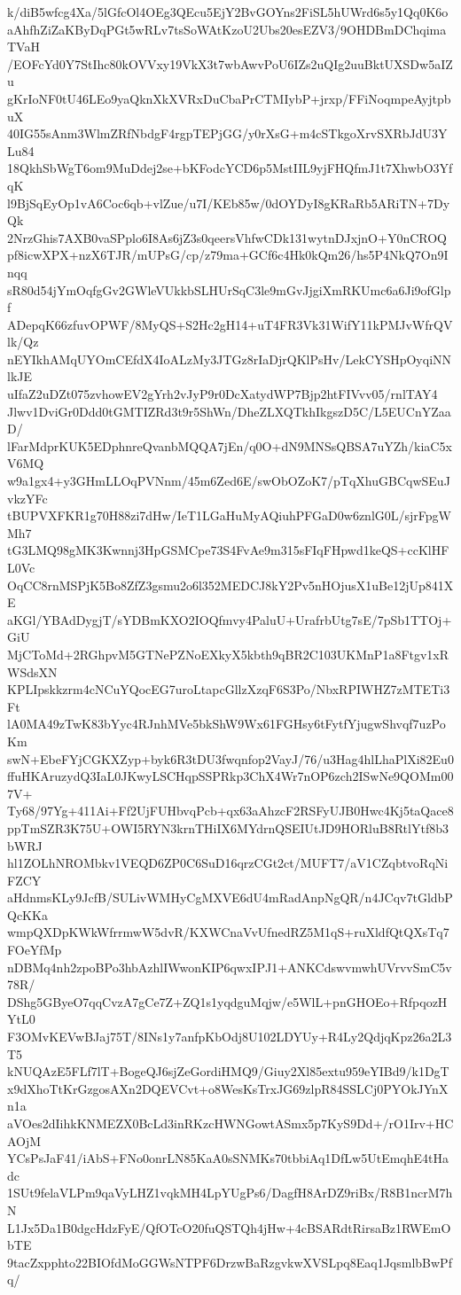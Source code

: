 k/diB5wfcg4Xa/5lGfcOl4OEg3QEcu5EjY2BvGOYns2FiSL5hUWrd6s5y1Qq0K6o
aAhfhZiZaKByDqPGt5wRLv7tsSoWAtKzoU2Ubs20esEZV3/9OHDBmDChqimaTVaH
/EOFcYd0Y7StIhc80kOVVxy19VkX3t7wbAwvPoU6IZs2uQIg2uuBktUXSDw5aIZu
gKrIoNF0tU46LEo9yaQknXkXVRxDuCbaPrCTMIybP+jrxp/FFiNoqmpeAyjtpbuX
40IG55sAnm3WlmZRfNbdgF4rgpTEPjGG/y0rXsG+m4cSTkgoXrvSXRbJdU3YLu84
18QkhSbWgT6om9MuDdej2se+bKFodcYCD6p5MstIIL9yjFHQfmJ1t7XhwbO3YfqK
l9BjSqEyOp1vA6Coc6qb+vlZue/u7I/KEb85w/0dOYDyI8gKRaRb5ARiTN+7DyQk
2NrzGhis7AXB0vaSPplo6I8As6jZ3s0qeersVhfwCDk131wytnDJxjnO+Y0nCROQ
pf8icwXPX+nzX6TJR/mUPsG/cp/z79ma+GCf6c4Hk0kQm26/hs5P4NkQ7On9Inqq
sR80d54jYmOqfgGv2GWleVUkkbSLHUrSqC3le9mGvJjgiXmRKUmc6a6Ji9ofGlpf
ADepqK66zfuvOPWF/8MyQS+S2Hc2gH14+uT4FR3Vk31WifY11kPMJvWfrQVlk/Qz
nEYIkhAMqUYOmCEfdX4IoALzMy3JTGz8rIaDjrQKlPsHv/LekCYSHpOyqiNNlkJE
uIfaZ2uDZt075zvhowEV2gYrh2vJyP9r0DcXatydWP7Bjp2htFIVvv05/rnlTAY4
Jlwv1DviGr0Ddd0tGMTIZRd3t9r5ShWn/DheZLXQTkhIkgszD5C/L5EUCnYZaaD/
lFarMdprKUK5EDphnreQvanbMQQA7jEn/q0O+dN9MNSsQBSA7uYZh/kiaC5xV6MQ
w9a1gx4+y3GHmLLOqPVNnm/45m6Zed6E/swObOZoK7/pTqXhuGBCqwSEuJvkzYFc
tBUPVXFKR1g70H88zi7dHw/IeT1LGaHuMyAQiuhPFGaD0w6znlG0L/sjrFpgWMh7
tG3LMQ98gMK3Kwnnj3HpGSMCpe73S4FvAe9m315sFIqFHpwd1keQS+ccKlHFL0Vc
OqCC8rnMSPjK5Bo8ZfZ3gsmu2o6l352MEDCJ8kY2Pv5nHOjusX1uBe12jUp841XE
aKGl/YBAdDygjT/sYDBmKXO2IOQfmvy4PaluU+UrafrbUtg7sE/7pSb1TTOj+GiU
MjCToMd+2RGhpvM5GTNePZNoEXkyX5kbth9qBR2C103UKMnP1a8Ftgv1xRWSdsXN
KPLIpskkzrm4cNCuYQocEG7uroLtapcGllzXzqF6S3Po/NbxRPIWHZ7zMTETi3Ft
lA0MA49zTwK83bYyc4RJnhMVe5bkShW9Wx61FGHsy6tFytfYjugwShvqf7uzPoKm
swN+EbeFYjCGKXZyp+byk6R3tDU3fwqnfop2VayJ/76/u3Hag4hlLhaPlXi82Eu0
ffuHKAruzydQ3IaL0JKwyLSCHqpSSPRkp3ChX4Wr7nOP6zch2ISwNe9QOMm007V+
Ty68/97Yg+411Ai+Ff2UjFUHbvqPcb+qx63aAhzcF2RSFyUJB0Hwc4Kj5taQace8
ppTmSZR3K75U+OWI5RYN3krnTHiIX6MYdrnQSEIUtJD9HORluB8RtlYtf8b3bWRJ
hl1ZOLhNROMbkv1VEQD6ZP0C6SuD16qrzCGt2ct/MUFT7/aV1CZqbtvoRqNiFZCY
aHdnmsKLy9JcfB/SULivWMHyCgMXVE6dU4mRadAnpNgQR/n4JCqv7tGldbPQcKKa
wmpQXDpKWkWfrrmwW5dvR/KXWCnaVvUfnedRZ5M1qS+ruXldfQtQXsTq7FOeYfMp
nDBMq4nh2zpoBPo3hbAzhlIWwonKIP6qwxIPJ1+ANKCdswvmwhUVrvvSmC5v78R/
DShg5GByeO7qqCvzA7gCe7Z+ZQ1s1yqdguMqjw/e5WlL+pnGHOEo+RfpqozHYtL0
F3OMvKEVwBJaj75T/8INs1y7anfpKbOdj8U102LDYUy+R4Ly2QdjqKpz26a2L3T5
kNUQAzE5FLf7lT+BogeQJ6sjZeGordiHMQ9/Giuy2Xl85extu959eYIBd9/k1DgT
x9dXhoTtKrGzgosAXn2DQEVCvt+o8WesKsTrxJG69zlpR84SSLCj0PYOkJYnXn1a
aVOes2dIihkKNMEZX0BcLd3inRKzcHWNGowtASmx5p7KyS9Dd+/rO1Irv+HCAOjM
YCsPsJaF41/iAbS+FNo0onrLN85KaA0sSNMKs70tbbiAq1DfLw5UtEmqhE4tHadc
1SUt9felaVLPm9qaVyLHZ1vqkMH4LpYUgPs6/DagfH8ArDZ9riBx/R8B1ncrM7hN
L1Jx5Da1B0dgcHdzFyE/QfOTcO20fuQSTQh4jHw+4cBSARdtRirsaBz1RWEmObTE
9tacZxpphto22BIOfdMoGGWsNTPF6DrzwBaRzgvkwXVSLpq8Eaq1JqsmlbBwPfq/

